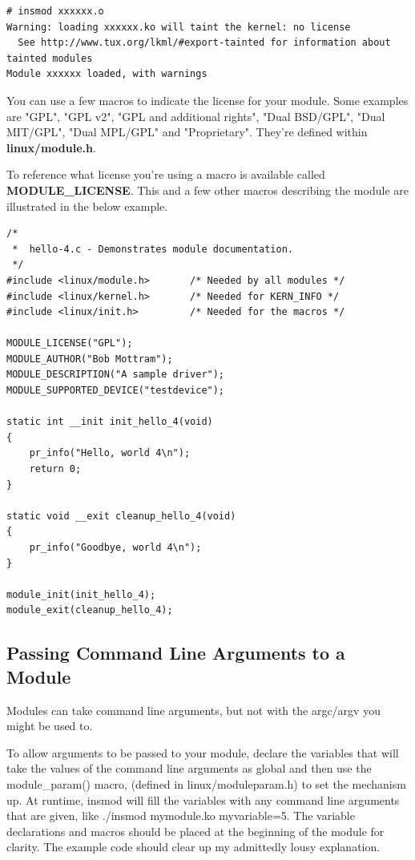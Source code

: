 \documentclass[11pt]{article}
\begin{document}
\begin{verbatim}
# insmod xxxxxx.o
Warning: loading xxxxxx.ko will taint the kernel: no license
  See http://www.tux.org/lkml/#export-tainted for information about tainted modules
Module xxxxxx loaded, with warnings
\end{verbatim}

You can use a few macros to indicate the license for your module. Some examples are "GPL", "GPL v2", "GPL and additional rights", "Dual BSD/GPL", "Dual MIT/GPL", "Dual MPL/GPL" and "Proprietary". They're defined within \textbf{linux/module.h}.

To reference what license you're using a macro is available called \textbf{MODULE\_LICENSE}. This and a few other macros describing the module are illustrated in the below example.

\begin{verbatim}
/*
 *  hello-4.c - Demonstrates module documentation.
 */
#include <linux/module.h>       /* Needed by all modules */
#include <linux/kernel.h>       /* Needed for KERN_INFO */
#include <linux/init.h>         /* Needed for the macros */

MODULE_LICENSE("GPL");
MODULE_AUTHOR("Bob Mottram");
MODULE_DESCRIPTION("A sample driver");
MODULE_SUPPORTED_DEVICE("testdevice");

static int __init init_hello_4(void)
{
    pr_info("Hello, world 4\n");
    return 0;
}

static void __exit cleanup_hello_4(void)
{
    pr_info("Goodbye, world 4\n");
}

module_init(init_hello_4);
module_exit(cleanup_hello_4);
\end{verbatim}

\subsection*{Passing Command Line Arguments to a Module}
\label{sec-4-5}
Modules can take command line arguments, but not with the argc/argv you might be used to.

To allow arguments to be passed to your module, declare the variables that will take the values of the command line arguments as global and then use the module\_param() macro, (defined in linux/moduleparam.h) to set the mechanism up. At runtime, insmod will fill the variables with any command line arguments that are given, like ./insmod mymodule.ko myvariable=5. The variable declarations and macros should be placed at the beginning of the module for clarity. The example code should clear up my admittedly lousy explanation.
\end{document}
